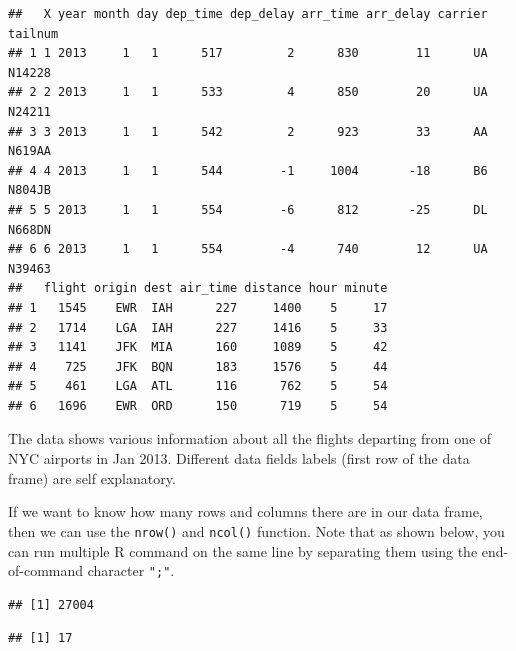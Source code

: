 \documentclass[11pt, letterpaper, twoside]{memoir}\usepackage{knitr}
\begin{document}
\begin{knitrout}
\color{fgcolor}\begin{kframe}
\begin{alltt}
\end{alltt}
\begin{verbatim}
##   X year month day dep_time dep_delay arr_time arr_delay carrier tailnum
## 1 1 2013     1   1      517         2      830        11      UA  N14228
## 2 2 2013     1   1      533         4      850        20      UA  N24211
## 3 3 2013     1   1      542         2      923        33      AA  N619AA
## 4 4 2013     1   1      544        -1     1004       -18      B6  N804JB
## 5 5 2013     1   1      554        -6      812       -25      DL  N668DN
## 6 6 2013     1   1      554        -4      740        12      UA  N39463
##   flight origin dest air_time distance hour minute
## 1   1545    EWR  IAH      227     1400    5     17
## 2   1714    LGA  IAH      227     1416    5     33
## 3   1141    JFK  MIA      160     1089    5     42
## 4    725    JFK  BQN      183     1576    5     44
## 5    461    LGA  ATL      116      762    5     54
## 6   1696    EWR  ORD      150      719    5     54
\end{verbatim}
\end{kframe}
\end{knitrout}

The data shows various information about all the flights departing from one of NYC airports in Jan 2013. Different data fields labels (first row of the data frame) are self explanatory. 

If we want to know how many rows and columns there are in our data frame, then we can use the \texttt{nrow()} and \texttt{ncol()}   function. Note that as shown below, you can run multiple R command on the same line by separating them using the end-of-command character \texttt{";"}.

\begin{knitrout}
\color{fgcolor}\begin{kframe}
\begin{alltt}
\end{alltt}
\begin{verbatim}
## [1] 27004
\end{verbatim}
\begin{alltt}
\end{alltt}
\begin{verbatim}
## [1] 17
\end{verbatim}
\end{kframe}
\end{knitrout}
\end{document}
